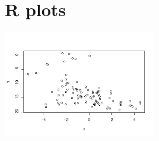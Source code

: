 \documentclass[
]{article}
\begin{document}
\hypertarget{r-plots}{%
\section{R plots}\label{r-plots}}

\begin{flushright}\includegraphics[width=0.5\textwidth]{test_engEviews_files/figure-latex/label-1} \end{flushright}
\end{document}
